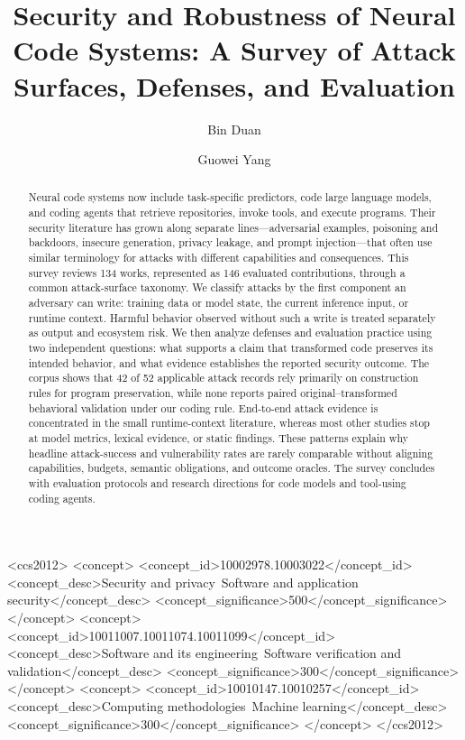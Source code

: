 \documentclass[acmsmall,screen,review]{acmart}
\begin{document}
\title{Security and Robustness of Neural Code Systems: A Survey of Attack Surfaces, Defenses, and Evaluation}

\author{Bin Duan}
\author{Guowei Yang}

\begin{abstract}
Neural code systems now include task-specific predictors, code large language models, and coding agents that retrieve repositories, invoke tools, and execute programs. Their security literature has grown along separate lines---adversarial examples, poisoning and backdoors, insecure generation, privacy leakage, and prompt injection---that often use similar terminology for attacks with different capabilities and consequences. This survey reviews 134 works, represented as 146 evaluated contributions, through a common attack-surface taxonomy. We classify attacks by the first component an adversary can write: training data or model state, the current inference input, or runtime context. Harmful behavior observed without such a write is treated separately as output and ecosystem risk. We then analyze defenses and evaluation practice using two independent questions: what supports a claim that transformed code preserves its intended behavior, and what evidence establishes the reported security outcome. The corpus shows that 42 of 52 applicable attack records rely primarily on construction rules for program preservation, while none reports paired original--transformed behavioral validation under our coding rule. End-to-end attack evidence is concentrated in the small runtime-context literature, whereas most other studies stop at model metrics, lexical evidence, or static findings. These patterns explain why headline attack-success and vulnerability rates are rarely comparable without aligning capabilities, budgets, semantic obligations, and outcome oracles. The survey concludes with evaluation protocols and research directions for code models and tool-using coding agents.
\end{abstract}

\begin{CCSXML}
<ccs2012>
 <concept>
  <concept_id>10002978.10003022</concept_id>
  <concept_desc>Security and privacy~Software and application security</concept_desc>
  <concept_significance>500</concept_significance>
 </concept>
 <concept>
  <concept_id>10011007.10011074.10011099</concept_id>
  <concept_desc>Software and its engineering~Software verification and validation</concept_desc>
  <concept_significance>300</concept_significance>
 </concept>
 <concept>
  <concept_id>10010147.10010257</concept_id>
  <concept_desc>Computing methodologies~Machine learning</concept_desc>
  <concept_significance>300</concept_significance>
 </concept>
</ccs2012>
\end{CCSXML}
\end{document}
